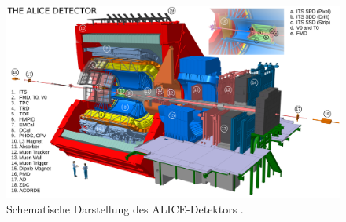 \documentclass[12pt,a4paper]{report}
\begin{document}
\begin{figure}
\centering
\includegraphics[width=15cm]{Alice.png} 
\caption{Schematische Darstellung des ALICE-Detektors \cite{Tauro:2263642}.}
\label{AliceDetector}
\end{figure}
\end{document}
